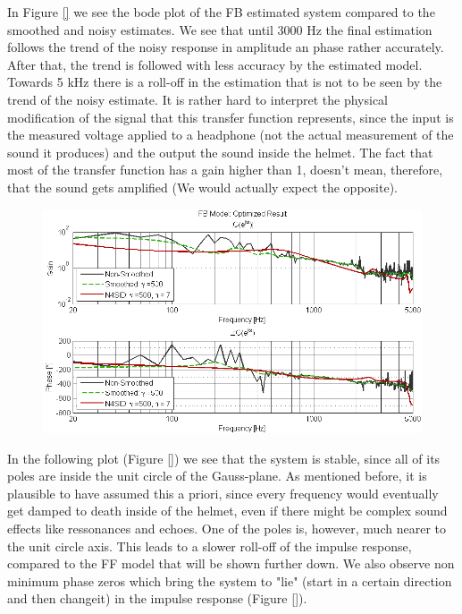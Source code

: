 In Figure \ref{} we see the bode plot of the FB estimated system compared to the smoothed and noisy estimates. We see that until 3000 Hz the final estimation follows the trend of the noisy response in amplitude an phase rather accurately. After that, the trend is followed with less accuracy by the estimated model. Towards 5 kHz there is a roll-off in the estimation that is not to be seen by the trend of the noisy estimate. It is rather hard to interpret the physical modification of the signal that this transfer function represents, since the input is the measured voltage applied to a headphone (not the actual measurement of the sound it produces) and the output the sound inside the helmet. The fact that most of the transfer function has a gain higher than 1, doesn't mean, therefore, that the sound gets amplified (We would actually expect the opposite). \\


\begin{figure}[h]
\centering
\includegraphics[width=1.0\textwidth]{pics/results_FB}
\caption{}
\label{pic:}
\end{figure}

In the following plot (Figure \ref{}) we see that the system is stable, since all of its poles are inside the unit circle of the Gauss-plane. As mentioned before, it is plausible to have assumed this a priori, since every frequency would eventually get damped to death inside of the helmet, even if there might be complex sound effects like ressonances and echoes. One of the poles is, however, much nearer to the unit circle axis. This leads to a slower roll-off of the impulse response, compared to the FF model that will be shown further down. We also observe non minimum phase zeros which bring the system to "lie" (start in a certain direction and then changeit) in the impulse response (Figure \ref{}).

